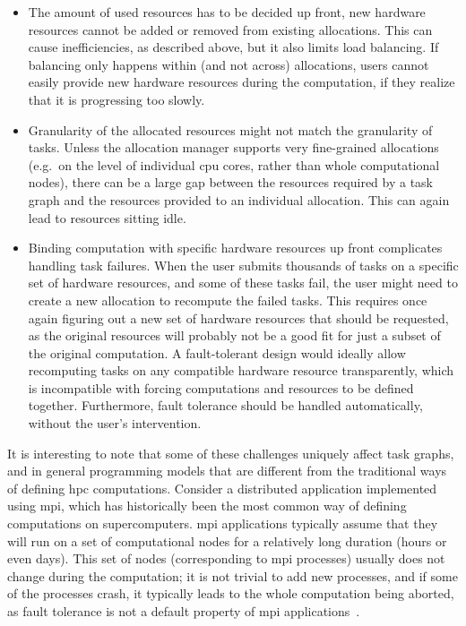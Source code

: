 \begin{itemize}
	\item The amount of used resources has to be decided up front, new hardware resources cannot be added or
	      removed from existing allocations. This can cause inefficiencies, as described above, but it also
	      limits load balancing. If balancing only happens within (and not across) allocations, users cannot
	      easily provide new hardware resources during the computation, if they realize that it is
	      progressing too slowly.
	\item Granularity of the allocated resources might not match the granularity of tasks. Unless the
	      allocation manager supports very fine-grained allocations (e.g.\ on the level of individual
	      \gls{cpu} cores, rather than whole computational nodes), there can be a large gap
	      between the resources required by a task graph and the resources provided to an individual
	      allocation. This can again lead to resources sitting idle.
	\item Binding computation with specific hardware resources up front complicates handling task failures.
	      When the user submits thousands of tasks on a specific set of hardware resources, and some of these
	      tasks fail, the user might need to create a new allocation to recompute the failed tasks. This
	      requires once again figuring out a new set of hardware resources that should be requested, as the
	      original resources will probably not be a good fit for just a subset of the original computation. A
	      fault-tolerant design would ideally allow recomputing tasks on any compatible hardware resource
	      transparently, which is incompatible with forcing computations and resources to be defined
	      together. Furthermore, fault tolerance should be handled automatically, without the user's
	      intervention.
\end{itemize}

It is interesting to note that some of these challenges uniquely affect task graphs, and in general
programming models that are different from the traditional ways of defining \gls{hpc}
computations. Consider a distributed application implemented using \gls{mpi}, which
has historically been the most common way of defining computations on supercomputers.
\gls{mpi} applications typically assume that they will run on a set of computational
nodes for a relatively long duration (hours or even days). This set of nodes (corresponding to
\gls{mpi} processes) usually does not change during the computation; it is not
trivial to add new processes, and if some of the processes crash, it typically leads to the whole
computation being aborted, as fault tolerance is not a default property of \gls{mpi}
applications~\cite{fault_tolerant_mpi}.

